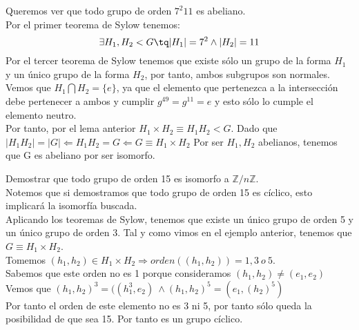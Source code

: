 \documentclass[nochap]{apuntes}
\begin{document}
 \begin{example}
  Queremos ver que todo grupo de orden $7^{2}11$  es abeliano.\\
  Por el primer teorema de Sylow tenemos: \\
  \[\exists H_1, H_2 <G \tq |H_1|=7^{2} \wedge |H_2|=11\]
  Por el tercer teorema de Sylow tenemos que existe sólo un grupo de la forma $H_1$  y un único grupo de la forma $H_2$, por tanto,
  ambos subgrupos son normales.\\
  Vemos que $H_1 \bigcap H_2 = \{e\}$, ya que el elemento que pertenezca a la intersección debe pertenecer a ambos y cumplir $g^49=g^11=e$
  y esto sólo lo cumple el elemento neutro.\\
  Por tanto, por el lema anterior $H_1\times H_2 \equiv H_1H_2 < G$. Dado que $|H_1H_2|=|G| \Leftarrow H_1H_2=G \Leftarrow G \equiv H_1 \times H_2$
  Por ser $H_1, H_2$  abelianos, tenemos que G es abeliano por ser isomorfo.
  \end{example}

  \begin{example}
   Demostrar que todo grupo de orden 15 es isomorfo a $\mathbb{Z}/n\mathbb{Z}$.\\
   Notemos que si demostramos que todo grupo de orden 15 es cíclico, esto implicará la isomorfía buscada.\\
   Aplicando los teoremas de Sylow, tenemos que existe un único grupo de orden 5 y un único grupo de orden 3. Tal y como vimos en el
   ejemplo anterior, tenemos que $G\equiv H_1\times H_2$.\\
   Tomemos $(h_1, h_2)\in H_1 \times H_2 \Rightarrow orden((h_1, h_2))=1,3\ o \ 5$.\\
   Sabemos que este orden no es 1 porque consideramos  $(h_1, h_2)\neq (e_1, e_2)$\\
   Vemos que $(h_1, h_2)^{3}=((h_1^{3}, e_2) \ \wedge (h_1, h_2)^{5}=(e_1, (h_2)^{5})$\\
   Por tanto el orden de este elemento no es 3 ni 5, por tanto sólo queda la posibilidad de que sea 15. Por tanto es un grupo cíclico.
  \end{example}
\end{document}
